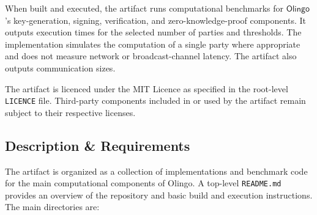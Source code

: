 \documentclass[nonacm,sigconf]{acmart}
\begin{document}
When built and executed, the artifact runs computational benchmarks for
$\mathsf{Olingo}$'s key-generation, signing, verification, and zero-knowledge-proof
components. It outputs execution times for the selected number of parties and
thresholds. The implementation simulates the computation of a single party
where appropriate and does not measure network or broadcast-channel latency. The artifact also outputs communication sizes.

The artifact is licenced under the MIT Licence as specified in the root-level \texttt{LICENCE} file. Third-party components included in or used by the artifact remain
subject to their respective licenses.


\subsection{Description \& Requirements}



The artifact is organized as a collection of implementations and benchmark
code for the main computational components of Olingo. A top-level
\texttt{README.md} provides an overview of the repository and basic build and
execution instructions. The main directories are:
\end{document}
